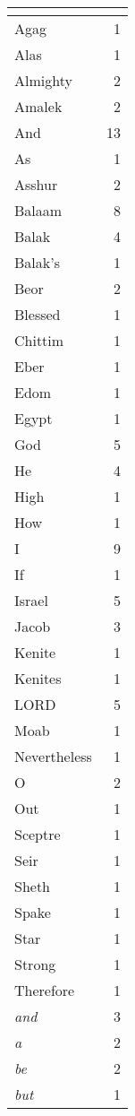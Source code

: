 \begin{center}
\begin{longtable}{l|r}
\hline \multicolumn{2}{c}{{ }} \\ \hline
\endfoot 
Agag & 1\\ \hline 
Alas & 1\\ \hline 
Almighty & 2\\ \hline 
Amalek & 2\\ \hline 
And & 13\\ \hline 
As & 1\\ \hline 
Asshur & 2\\ \hline 
Balaam & 8\\ \hline 
Balak & 4\\ \hline 
Balak's & 1\\ \hline 
Beor & 2\\ \hline 
Blessed & 1\\ \hline 
Chittim & 1\\ \hline 
Eber & 1\\ \hline 
Edom & 1\\ \hline 
Egypt & 1\\ \hline 
God & 5\\ \hline 
He & 4\\ \hline 
High & 1\\ \hline 
How & 1\\ \hline 
I & 9\\ \hline 
If & 1\\ \hline 
Israel & 5\\ \hline 
Jacob & 3\\ \hline 
Kenite & 1\\ \hline 
Kenites & 1\\ \hline 
LORD & 5\\ \hline 
Moab & 1\\ \hline 
Nevertheless & 1\\ \hline 
O & 2\\ \hline 
Out & 1\\ \hline 
Sceptre & 1\\ \hline 
Seir & 1\\ \hline 
Sheth & 1\\ \hline 
Spake & 1\\ \hline 
Star & 1\\ \hline 
Strong & 1\\ \hline 
Therefore & 1\\ \hline 
\emph{and} & 3\\ \hline 
\emph{a} & 2\\ \hline 
\emph{be} & 2\\ \hline 
\emph{but} & 1\\ \hline 

\end{longtable}
\end{center}
